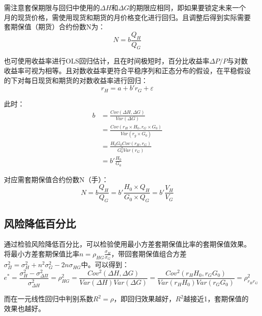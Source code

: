\documentclass[11pt]{article}
\begin{document}
需注意套保期限与回归中使用的$\Delta H$和$\Delta G$的期限应相同，即如果要锁定未来一个月的现货价格，需使用现货和期货的月价格变化进行回归。且调整后得到实际需要套期保值（期货）合约份数N为：
\begin{equation*}
    N =  b \frac{Q_H}{Q_G}
\end{equation*}

也可使用收益率进行OLS回归估计，且在时间极短时，百分比收益率$\Delta P/P$与对数收益率可视为相等。且对数收益率更符合平稳序列和正态分布的假设，在平稳假设的下对每日现货和期货的对数收益率进行回归：
\begin{equation*}
    r_H = a + b'r_G + \varepsilon
\end{equation*}

此时：
\begin{align*}
    b &= \frac{Cov(\Delta H,\Delta G)}{Var(\Delta G)} \\ 
    &= \frac{Cov(r_H \times H_0,r_G \times G_0)}{Var(r_g \times G_0)} \\
    &= \frac{H_0G_0 Cov(r_H,r_G)}{G_0^2 Var(r_G)} \\
    &= b'\frac{H_0}{G_0}
\end{align*}

对应需套期保值合约份数N（手）：
\begin{equation*}
    N =  b\frac{Q_H}{Q_G} = b'\frac{H_0 \times Q_H}{G_0 \times Q_G} = b'\frac{V_H}{V_G}
\end{equation*}

\subsection{风险降低百分比}
通过检验风险降低百分比，可以检验使用最小方差套期保值比率的套期保值效果。将最小方差套期保值比率$n = \rho_{HG}\frac{\sigma_{H}}{\sigma_{G}}$，带回套期保值组合方差$\sigma_{\Pi}^2 = \sigma_H^2 + n^2\sigma_G^2 - 2n\sigma_{HG}$中。可以得到：
\begin{equation*}
    e^* = \frac{\sigma_{H}^2 - \sigma_{\Delta \Pi}^2}{\sigma_{\Delta H}^2} = \rho_{HG}^2
    =\frac{Cov^2(\Delta H, \Delta G)}{Var(\Delta H)Var(\Delta G)}
    =\frac{Cov^2(r_H H_0, r_G G_0)}{Var(r_H H_0)Var(r_G G_0)}
    =\rho_{r_Hr_G}^2
\end{equation*}

而在一元线性回归中判别系数$R^2=\rho$，即回归效果越好，$R^2$越接近1，套期保值的效果也越好。
\end{document}
